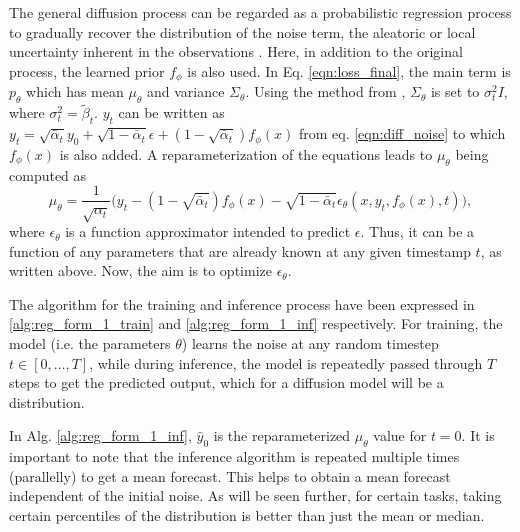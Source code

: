 \documentclass{article}
\begin{document}
The general diffusion process can be regarded as a probabilistic regression process to gradually recover the distribution of the noise term, the aleatoric or local uncertainty inherent in the observations \citep{kendall2017uncertainties}. Here, in addition to the original process, the learned prior $f_\phi$ is also used. In Eq. \ref{eqn:loss_final}, the main term is $p_\theta$ which has mean $\mu_\theta$ and variance $\Sigma_\theta$. Using the method from \citet{ho2020denoising}, $\Sigma_\theta$ is set to $\sigma_t^2I$, where $\sigma_t^2=\tilde{\beta}_t$. $y_t$ can be written as 
  $y_t = \sqrt{\bar{\alpha}_t}y_0 + \sqrt{1-\bar{\alpha}_t}\epsilon + (1-\sqrt{\bar{\alpha}_t})f_\phi(x)$
from eq. \ref{eqn:diff_noise} to which $f_\phi(x)$ is also added. A reparameterization of the equations leads to $\mu_\theta$ being computed as 
\begin{equation}
  \mu_\theta = \frac{1}{\sqrt{\alpha_t}}\biggl(y_t-(1-\sqrt{\bar{\alpha}_t})f_\phi(x)-\sqrt{1-\bar{\alpha}_t}\epsilon_\theta(x,y_t,f_\phi(x),t)\biggr),
\end{equation}
where $\epsilon_\theta$ is a function approximator intended to predict $\epsilon$. Thus, it can be a function of any parameters that are already known at any given timestamp $t$, as written above. Now, the aim is to optimize $\epsilon_\theta$.

The algorithm for the training and inference process have been expressed in \ref{alg:reg_form_1_train} and \ref{alg:reg_form_1_inf} respectively. For training, the model (i.e. the parameters $\theta$) learns the noise at any random timestep $t \in [0, \dots, T]$, while during inference, the model is repeatedly passed through $T$ steps to get the predicted output, which for a diffusion model will be a distribution. 

In Alg. \ref{alg:reg_form_1_inf}, $\hat{ y}_0$ is the reparameterized $\mu_\theta$ value for $t=0$. It is important to note that the inference algorithm is repeated multiple times (parallelly) to get a mean forecast. This helps to obtain a mean forecast independent of the initial noise. As will be seen further, for certain tasks, taking certain percentiles of the distribution is better than just the mean or median.
\end{document}
